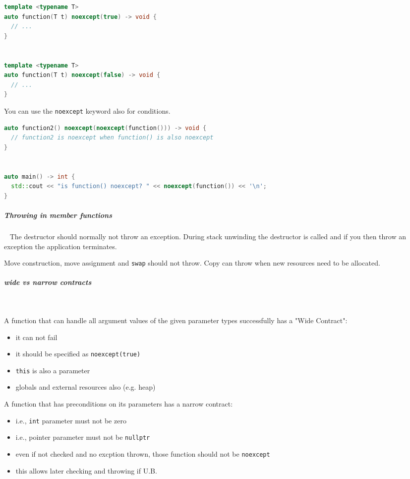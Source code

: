 \documentclass[11pt,twoside,landscape]{article}
\begin{document}
\begin{multicols}{2}
\begin{lstlisting}[language=c++,label=lst:exaple-for-noexcept-in-signature,caption={Exaple for noexcept in signature},captionpos=b,numbers=none]
template <typename T>
auto function(T t) noexcept(true) -> void {
  // ...
}


template <typename T>
auto function(T t) noexcept(false) -> void {
  // ...
}
\end{lstlisting}

You can use the \texttt{noexcept} keyword also for conditions.

\begin{lstlisting}[language=c++,label=lst:example-for-conditional-noexcept,caption={Example for conditional noexcept},captionpos=b,numbers=none]
auto function2() noexcept(noexcept(function())) -> void {
  // function2 is noexcept when function() is also noexcept
}


auto main() -> int {
  std::cout << "is function() noexcept? " << noexcept(function()) << '\n';
}
\end{lstlisting}

\subparagraph{Throwing in member functions} \
\label{sec:org9be21b3}
The destructor should normally not throw an exception.
During stack unwinding the destructor is called and if you then throw an exception the application terminates.

Move construction, move assignment and \texttt{swap} should not throw.
Copy can throw when new resources need to be allocated.

\subparagraph{wide vs narrow contracts} \
\label{sec:orgc8240dc}

A function that can handle all argument values of the given parameter types successfully has a "Wide Contract":
\begin{itemize}
\item it can not fail
\item it should be specified as \texttt{noexcept(true)}
\item \texttt{this} is also a parameter
\item globals and external resources also (e.g. heap)
\end{itemize}


A function that has preconditions on its parameters has a narrow contract:
\begin{itemize}
\item i.e., \texttt{int} parameter must not be zero
\item i.e., pointer parameter must not be \texttt{nullptr}
\item even if not checked and no excption thrown, those function should not be \texttt{noexcept}
\item this allows later checking and throwing if U.B.
\end{itemize}


\end{multicols}
\end{document}
